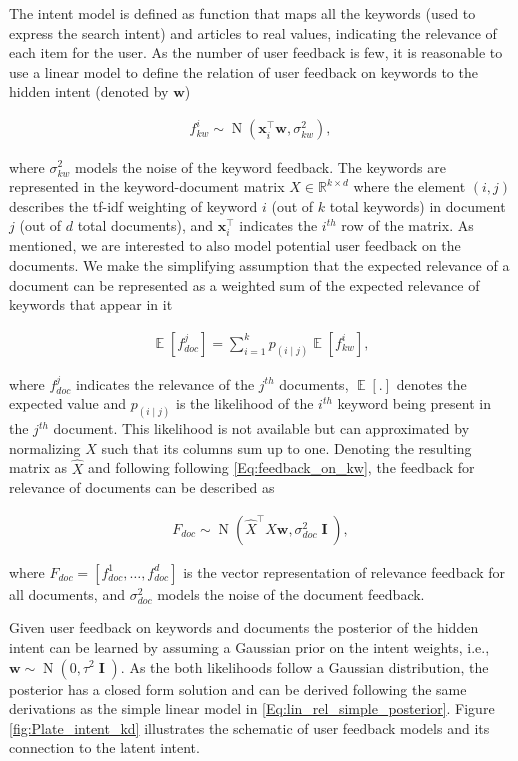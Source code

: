 \documentclass[dissertation,math,vertlayout,pdfa,colorlinks]{aaltoseries}
\newcommand{\bw}{\bm{w}}
\DeclareMathOperator{\eye}{\textbf{I}}
\DeclareMathOperator{\normalpdf}{N}
\DeclareMathOperator{\E}{\mathbb{E}}
\newcommand{\tp}{^{\top}}
\begin{document}
The intent model is defined as function that maps all the keywords (used to express the search intent) and articles to real values, indicating the relevance of each item for the user. As the number of user feedback is few, it is reasonable to use a linear model to define the relation of user feedback on keywords to the hidden intent (denoted by $\bw$)

\begin{align}\label{Eq:feedback_on_kw} 
f_{kw}^{i} \sim \normalpdf(\bm{x}_i\tp \bw, \sigma_{kw}^2), 
\end{align}

\noindent where $\sigma_{kw}^2$ models the noise of the keyword feedback. The keywords are represented in the keyword-document matrix $X \in \mathbb{R}^{k \times d}$ where the element $(i,j)$ describes the tf-idf weighting of keyword $i$ (out of $k$ total keywords) in document $j$ (out of $d$ total documents), and $\bm{x}_i\tp$ indicates the $i^{th}$ row of the matrix. As mentioned, we are interested to also model potential user feedback on the documents. We make the simplifying assumption that the expected relevance of a document can be represented as a weighted sum of the expected relevance of keywords that appear in it

\begin{align}\label{Eq:doc_key_relation} 
 \E[f_{doc}^{j}] = \sum_{i=1}^{k} p_{(i \mid j)}  \E[f_{kw}^{i}],
\end{align}

\noindent where $f_{doc}^{j}$ indicates the relevance of the $j^{th}$ documents, $\E[.]$ denotes the expected value and $p_{(i \mid j)}$ is the likelihood of the $i^{th}$ keyword being present in the $j^{th}$ document. This likelihood is not available but can approximated by normalizing $X$ such that its columns sum up to one. Denoting the resulting matrix as $\hat{X}$ and following following \ref{Eq:feedback_on_kw}, the feedback for relevance of documents can be described as 

\begin{align}\label{Eq:doc_key_relation_vector} 
F_{doc} \sim \normalpdf(  \hat{X}\tp X \bw, \sigma_{doc}^2 \eye),
\end{align}  

\noindent where $F_{doc}=[f_{doc}^{1},\ldots,f_{doc}^{d}]$ is the vector representation of relevance feedback for all documents, and $\sigma_{doc}^2$ models the noise of the document feedback. 

Given user feedback on keywords and documents the posterior of the hidden intent can be learned by assuming a Gaussian prior on the intent weights, i.e., $\bw \sim \normalpdf(0,\tau^2 \eye)$. As the both likelihoods follow a Gaussian distribution, the posterior has a closed form solution and can be derived following the same derivations as the simple linear model in \ref{Eq:lin_rel_simple_posterior}. Figure \ref{fig:Plate_intent_kd} illustrates the schematic of user feedback models and its connection to the latent intent. 
\end{document}
